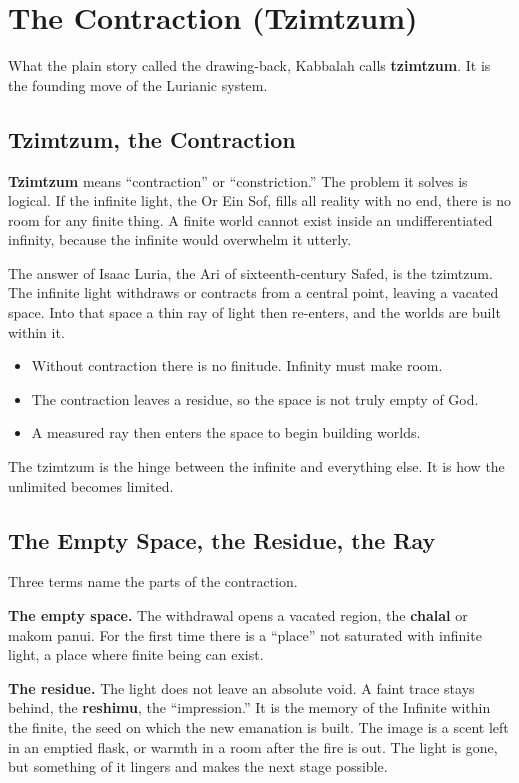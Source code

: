 \section{The Contraction (Tzimtzum)}

What the plain story called the drawing-back, Kabbalah calls \textbf{tzimtzum}. It
is the founding move of the Lurianic system.

\subsection{Tzimtzum, the Contraction}

\textbf{Tzimtzum} means \enquote{contraction} or \enquote{constriction.} The problem
it solves is logical. If the infinite light, the Or Ein Sof, fills all reality with
no end, there is no room for any finite thing. A finite world cannot exist inside an
undifferentiated infinity, because the infinite would overwhelm it utterly.

The answer of Isaac Luria, the Ari of sixteenth-century Safed, is the tzimtzum. The
infinite light withdraws or contracts from a central point, leaving a vacated space.
Into that space a thin ray of light then re-enters, and the worlds are built within
it.

\begin{itemize}
 \item Without contraction there is no finitude. Infinity must make room.
 \item The contraction leaves a residue, so the space is not truly empty of God.
 \item A measured ray then enters the space to begin building worlds.
\end{itemize}

The tzimtzum is the hinge between the infinite and everything else. It is how the
unlimited becomes limited.

\subsection{The Empty Space, the Residue, the Ray}

Three terms name the parts of the contraction.

\textbf{The empty space.} The withdrawal opens a vacated region, the \textbf{chalal}
or makom panui. For the first time there is a \enquote{place} not saturated with
infinite light, a place where finite being can exist.

\textbf{The residue.} The light does not leave an absolute void. A faint trace stays
behind, the \textbf{reshimu}, the \enquote{impression.} It is the memory of the
Infinite within the finite, the seed on which the new emanation is built. The image
is a scent left in an emptied flask, or warmth in a room after the fire is out. The
light is gone, but something of it lingers and makes the next stage possible.

